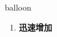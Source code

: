 
\begin{frame}
{\huge balloon}
\begin{center}
\begin{enumerate}\Large
  \item \textbf{迅速增加}
\end{enumerate}
\end{center}
\end{frame}
